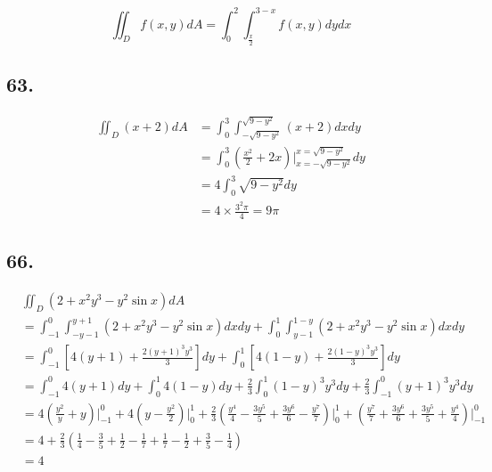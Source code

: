 \documentclass{article}
\begin{document}
  $$\iint_D f(x, y) dA = \int_0^2 \int_{\frac x 2}^{3-x} f(x, y) dy dx$$

  \subsection*{63. }

  $$\begin{aligned}
    \iint_D (x + 2) dA &= \int_0^3 \int_{-\sqrt{9-y^2}}^{\sqrt{9-y^2}}(x + 2) dx dy \\
    &= \int_0^3 (\frac{x^2}{2} + 2x)\biggl|_{x=-\sqrt{9-y^2}}^{x=\sqrt{9-y^2}} dy \\
    &= 4\int_0^3 \sqrt{9-y^2} dy \\
    &= 4 \times \frac{3^2\pi }{4} = 9\pi
  \end{aligned}$$
  \subsection*{66. }

  $$\begin{aligned}
    &\iint_D (2 + x^2y^3 - y^2 \sin x) dA \\
    &= \int_{-1}^{0}\int_{-y-1}^{y+1}(2 + x^2y^3-y^2\sin x)dx dy + \int_{0}^{1} \int_{y-1}^{1-y}(2 + x^2y^3-y^2\sin x) dx dy \\
    &= \int_{-1}^0 [4(y+1) + \frac{2(y+1)^3 y^3}{3}] dy + \int_0^1 [4(1-y) + \frac{2(1-y)^3 y^3}{3}] dy \\
    &= \int_{-1}^0 4(y+1) dy + \int_0^1 4(1-y) dy + \frac 2 3 \int_0^1 (1-y)^3 y^3 dy + \frac 2 3 \int_{-1}^0 (y+1)^3y^3dy \\
    &= 4(\frac{y^2}{y} + y)\biggl|_{-1}^0 + 4(y - \frac{y^2}{2})\biggl|_0^1 + \frac 2 3 (\frac{y^4}{4} - \frac{3y^5}{5} + \frac{3y^6}{6} - \frac{y^7}{7})\biggl|_0^1 + (\frac{y^7}{7} + \frac{3y^6}{6} + \frac{3y^5}{5} + \frac{y^4}{4})\biggl|_{-1}^0 \\
    &= 4 + \frac 2 3 (\frac 1 4 - \frac 3 5 + \frac 1 2 - \frac 1 7 + \frac 1 7 - \frac 1 2 + \frac 3 5 - \frac 1 4) \\
    &= 4
  \end{aligned}$$
\end{document}

